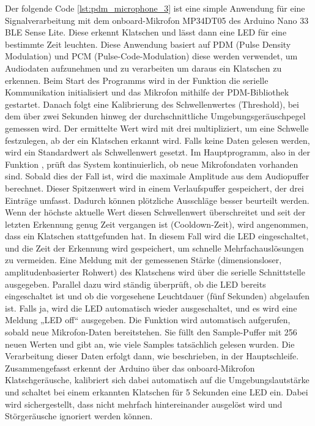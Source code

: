 Der folgende Code \ref{lst:pdm_microphone_3} ist eine simple Anwendung für eine Signalverarbeitung mit dem onboard-Mikrofon MP34DT05 des Arduino Nano 33 BLE Sense Lite. Diese erkennt Klatschen und lässt dann eine LED für eine bestimmte Zeit leuchten. Diese Anwendung basiert auf PDM (Pulse Density Modulation) und PCM (Pulse-Code-Modulation) diese werden verwendet, um Audiodaten aufzunehmen und zu verarbeiten um daraus ein Klatschen zu erkennen.
Beim Start des Programms wird in der Funktion  die serielle Kommunikation initialisiert und das Mikrofon mithilfe der PDM-Bibliothek gestartet. Danach folgt eine Kalibrierung des Schwellenwertes (Threshold), bei dem über zwei Sekunden hinweg der durchschnittliche Umgebungsgeräuschpegel gemessen wird. Der ermittelte Wert wird mit drei multipliziert, um eine Schwelle festzulegen, ab der ein Klatschen erkannt wird. Falls keine Daten gelesen werden, wird ein Standardwert als Schwellenwert gesetzt.
Im Hauptprogramm, also in der Funktion , prüft das System kontinuierlich, ob neue Mikrofondaten vorhanden sind. Sobald dies der Fall ist, wird die maximale Amplitude aus dem Audiopuffer berechnet. Dieser Spitzenwert wird in einem Verlaufspuffer gespeichert, der drei Einträge umfasst. Dadurch können plötzliche Ausschläge besser beurteilt werden. Wenn der höchste aktuelle Wert diesen Schwellenwert überschreitet und seit der letzten Erkennung genug Zeit vergangen ist (Cooldown-Zeit), wird angenommen, dass ein Klatschen stattgefunden hat. In diesem Fall wird die LED eingeschaltet, und die Zeit der Erkennung wird gespeichert, um schnelle Mehrfachauslösungen zu vermeiden. Eine Meldung mit der gemessenen Stärke (dimensionsloser, amplitudenbasierter Rohwert) des Klatschens wird über die serielle Schnittstelle ausgegeben.
Parallel dazu wird ständig überprüft, ob die LED bereits eingeschaltet ist und ob die vorgesehene Leuchtdauer (fünf Sekunden) abgelaufen ist. Falls ja, wird die LED automatisch wieder ausgeschaltet, und es wird eine Meldung „LED off“ ausgegeben.
Die Funktion  wird automatisch aufgerufen, sobald neue Mikrofon-Daten bereitstehen. Sie füllt den Sample-Puffer mit 256 neuen Werten und gibt an, wie viele Samples tatsächlich gelesen wurden. Die Verarbeitung dieser Daten erfolgt dann, wie beschrieben, in der Hauptschleife.
Zusammengefasst erkennt der Arduino über das onboard-Mikrofon Klatschgeräusche, kalibriert sich dabei automatisch auf die Umgebungslautstärke und schaltet bei einem erkannten Klatschen für 5 Sekunden eine LED ein. Dabei wird sichergestellt, dass nicht mehrfach hintereinander ausgelöst wird und Störgeräusche ignoriert werden können.

